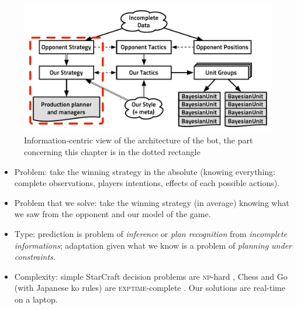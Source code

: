 \begin{figure}[!ht]
\begin{center}
\includegraphics[width=0.84\columnwidth]{images/starcraft_bbq_concept_STRATEGY.pdf}
\end{center}
\caption{Information-centric view of the architecture of the bot, the part concerning this chapter is in the dotted rectangle}
\label{fig:conceptSTRATEGY}
\end{figure}

\begin{itemize}
\item Problem: take the winning strategy in the absolute (knowing everything: complete observations, players intentions, effects of each possible actions).
\item Problem that we solve: take the winning strategy (in average) knowing what we saw from the opponent and our model of the game. 
\item Type: prediction is problem of \textit{inference} or \textit{plan recognition} from \textit{incomplete informations}; adaptation given what we know is a problem of \textit{planning under constraints}.
\item Complexity: simple StarCraft decision problems are \textsc{np}-hard \citep{GamingComplexity}, %
Chess \citep{Fraenkel81} and Go (with Japanese ko rules) are \textsc{exptime}-complete \citep{Robson83}. Our solutions are real-time on a laptop. %
\end{itemize}

